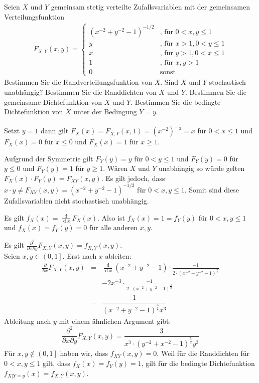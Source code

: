 \begin{Exercise}
	Seien $X$ und $Y$ gemeinsam stetig verteilte Zufallsvariablen mit
	der gemeinsamen Verteilungsfunktion%
	\begin{align*}
		F_{X,Y}(x,y)=\begin{cases}
		\left( x^{-2}+y^{-2}-1\right) ^{-1/2} &\text{, für } 0<x,y\leq1\\
		y &\text{, für } x>1, 0<y\leq 1\\
		x &\text{, für } y>1, 0<x\leq 1\\
		1 &\text{, für } x,y>1\\
		0 &\text{sonst}
		\end{cases}
	\end{align*}%
		\Question Bestimmen Sie die Randverteilungsfunktion von $X$.
		\Question Sind $X$ und $Y$ stochastisch unabh\"{a}ngig?
		\Question Bestimmen Sie die Randdichten von $X$ und $Y$.
		\Question Bestimmen Sie die gemeinsame Dichtefunktion von $X$ und $Y$.
		\Question Bestimmen Sie die bedingte Dichtefunktion von $X$ unter der Bedingung $%
		Y=y$. 
\end{Exercise}

\begin{Answer}
	\Question Setzt $y=1$ dann gilt $F_X(x)=F_{X,Y}(x,1)=\left(x^{-2}\right)^{-\frac{1}{2}}=x$ für $0<x\leq1$ und $F_X(x)=0$ für $x\leq 0$ und $F_X(x)=1$ für $x\geq1$.
	
	\Question Aufgrund der Symmetrie gilt $F_Y(y)=y$ für $0<y\leq1$ und $F_Y(y)=0$ für $y\leq 0$ und $F_Y(y)=1$ für $y\geq1$. Wären $X$ und $Y$ unabhängig so würde gelten $F_X(x)\cdot F_Y(y)=F_{XY}(x,y)$. Es gilt jedoch, dass $x\cdot y\neq F_{XY}(x,y)=\left( x^{-2}+y^{-2}-1\right) ^{-1/2}$ für $0<x,y\leq1$. Somit sind diese Zufallsvariablen nicht stochastisch unabhängig.
	
	\Question Es gilt $f_X(x)=\frac{\operatorname{d}}{\operatorname{d}x}F_X(x)$. Also ist $f_X(x)=1=f_Y(y)$ für $0<x,y\leq 1$ und $f_X(x)=f_Y(y)=0$ für alle anderen $x,y$.
	
	\Question Es gilt $\frac{\partial^2 }{\partial x\partial y}F_{X,Y}(x,y)=f_{X,Y}(x,y)$.\\
	Seien $x,y\in\left(0,1\right]$. Erst nach $x$ ableiten:
	\begin{eqnarray*}
		\frac{\partial}{\partial x}F_{X,Y}(x,y)&=&\frac{\operatorname{d}}{\operatorname{d}x}\left( x^{-2}+y^{-2}-1\right)\cdot \frac{-1}{2\cdot \left(x^{-2}+y^{-2}-1\right)^{\frac{3}{2}}}\\
		&=&-2x^{-3}\cdot\frac{-1}{2\cdot \left(x^{-2}+y^{-2}-1\right)^{\frac{3}{2}}}\\
		&=& \dfrac{1}{\left(x^{-2}+y^{-2}-1\right)^\frac{3}{2}x^3}
	\end{eqnarray*}
	Ableitung nach $y$ mit einem ähnlichen Argument gibt:
	\begin{equation*}
		\frac{\partial^2}{\partial x\partial y}F_{X,Y}(x,y)=\dfrac{3}{x^3\cdot\left(y^{-2}+x^{-2}-1\right)^\frac{5}{2}y^3}
	\end{equation*}
	Für $x,y\notin\left(0,1\right]$ haben wir, dass $f_{XY}(x,y)=0$.
	\Question Weil für die Randdichten für $0<x,y\leq1$ gilt, dass $f_X(x)=f_Y(y)=1$, gilt für die bedingte Dichtefunktion $f_{X\vert Y=y}(x)=f_{X,Y}(x,y)$.
\end{Answer}

